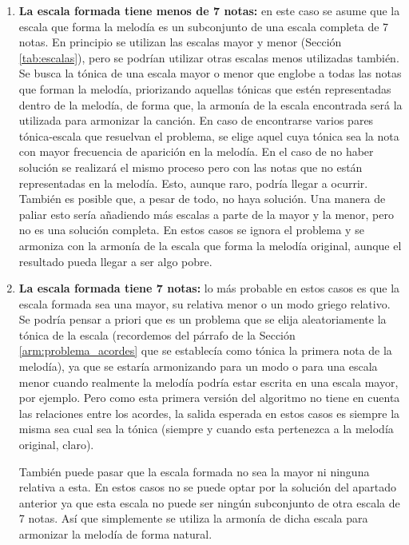 \begin{enumerate}
    \item[\textbullet] \textbf{La escala formada tiene menos de 7 notas:} en este caso se asume que la escala que forma la melodía es un subconjunto de una escala completa de 7 notas. En principio se utilizan las escalas mayor y menor (Sección \ref{tab:escalas}), pero se podrían utilizar otras escalas menos utilizadas también. Se busca la tónica de una escala mayor o menor que englobe a todas las notas que forman la melodía, priorizando aquellas tónicas que estén representadas dentro de la melodía, de forma que, la armonía de la escala encontrada será la utilizada para armonizar la canción. En caso de encontrarse varios pares tónica-escala que resuelvan el problema, se elige aquel cuya tónica sea la nota con mayor frecuencia de aparición en la melodía. En el caso de no haber solución se realizará el mismo proceso pero con las notas que no están representadas en la melodía. Esto, aunque raro, podría llegar a ocurrir. También es posible que, a pesar de todo, no haya solución. Una manera de paliar esto sería añadiendo más escalas a parte de la mayor y la menor, pero no es una solución completa. En estos casos se ignora el problema y se armoniza con la armonía de la escala que forma la melodía original, aunque el resultado pueda llegar a ser algo pobre.
    \item[\textbullet] \textbf{La escala formada tiene 7 notas:} lo más probable en estos casos es que la escala formada sea una mayor, su relativa menor o un modo griego relativo. Se podría pensar a priori que es un problema que se elija aleatoriamente la tónica de la escala (recordemos del párrafo de la Sección \ref{arm:problema_acordes} que se establecía como tónica la primera nota de la melodía), ya que se estaría armonizando para un modo o para una escala menor cuando realmente la melodía podría estar escrita en una escala mayor, por ejemplo. Pero como esta primera versión del algoritmo no tiene en cuenta las relaciones entre los acordes, la salida esperada en estos casos es siempre la misma sea cual sea la tónica (siempre y cuando esta pertenezca a la melodía original, claro).

    También puede pasar que la escala formada no sea la mayor ni ninguna relativa a esta. En estos casos no se puede optar por la solución del apartado anterior ya que esta escala no puede ser ningún subconjunto de otra escala de 7 notas. Así que simplemente se utiliza la armonía de dicha escala para armonizar la melodía de forma natural.


\end{enumerate}
